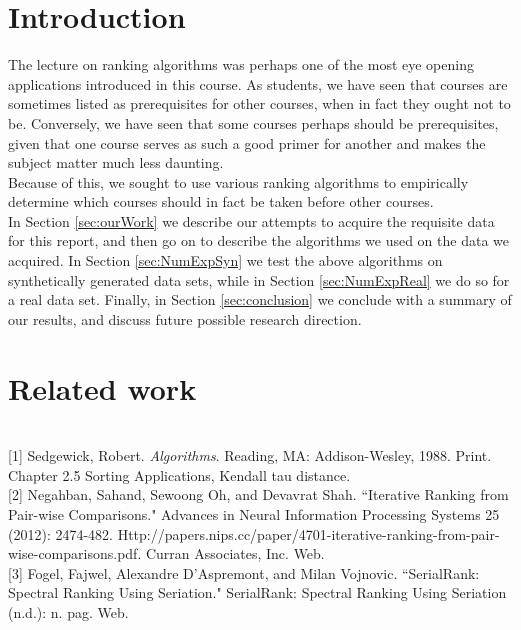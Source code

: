 \documentclass[10pt]{siamltex}
\begin{document}
\begin{pagewiselinenumbers}
\section{Introduction}

The lecture on ranking algorithms was perhaps one of the most eye opening applications introduced in this course. As students, we have seen that courses are sometimes listed as prerequisites for other courses, when in fact they ought not to be. Conversely, we have seen that some courses perhaps should be prerequisites, given that one course serves as such a good primer for another and makes the subject matter much less daunting.\\

Because of this, we sought to use various ranking algorithms to empirically determine which courses should in fact be taken before other courses.\\

In Section \ref{sec:ourWork} we describe our attempts to acquire the requisite data for this report, and then go on to describe the algorithms we used on the data we acquired. In Section  \ref{sec:NumExpSyn} we test the above algorithms on synthetically generated data sets, while in Section \ref{sec:NumExpReal} we do so for a real data set. Finally, in Section  \ref{sec:conclusion} we conclude with a summary of our results, and discuss future possible research direction. 

\section{Related work} \label{sec:relWork}\textcolor{white}{.}\\

[1] Sedgewick, Robert. \textit{Algorithms}. Reading, MA: Addison-Wesley, 1988. Print. Chapter 2.5 Sorting Applications, Kendall tau distance.\\

[2] Negahban, Sahand, Sewoong Oh, and Devavrat Shah. ``Iterative Ranking from Pair-wise Comparisons." Advances in Neural Information Processing Systems 25 (2012): 2474-482. Http://papers.nips.cc/paper/4701-iterative-ranking-from-pair-wise-comparisons.pdf. Curran Associates, Inc. Web.\\

[3] Fogel, Fajwel, Alexandre D'Aspremont, and Milan Vojnovic. ``SerialRank: Spectral Ranking Using Seriation." SerialRank: Spectral Ranking Using Seriation (n.d.): n. pag. Web.\\


\end{pagewiselinenumbers}
\end{document}
